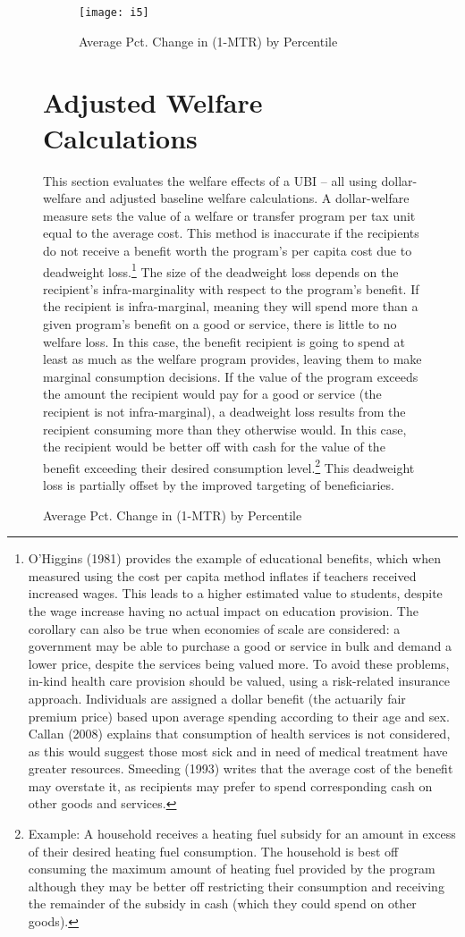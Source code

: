 \documentclass{article}
\begin{document}
\begin{figure}[H]
\begin{figure}[H]
\centering
\caption{Average Pct. Change in (1-MTR) by Percentile}
\texttt{[image: i5]}
\end{figure}

\section{Adjusted Welfare Calculations}
This section evaluates the welfare effects of a UBI -- all using dollar-welfare and adjusted baseline welfare calculations. A dollar-welfare measure sets the value of a welfare or transfer program per tax unit equal to the average cost. This method is inaccurate if the recipients do not receive a benefit worth the program’s per capita cost due to deadweight loss.\footnote{ O'Higgins (1981) provides the example of educational benefits, which when measured using the cost per capita method inflates if teachers received increased wages. This leads to a higher estimated value to students, despite the wage increase having no actual impact on education provision. The corollary can also be true when economies of scale are considered: a government may be able to purchase a good or service in bulk and demand a lower price, despite the services being valued more. To avoid these problems, in-kind health care provision should be valued, using a risk-related insurance approach. Individuals are assigned a dollar benefit (the actuarily fair premium price) based upon average spending according to their age and sex. Callan (2008) explains that consumption of health services is not considered, as this would suggest those most sick and in need of medical treatment have greater resources. Smeeding (1993) writes that the average cost of the benefit may overstate it, as recipients may prefer to spend corresponding cash on other goods and services.} The size of the deadweight loss depends on the recipient’s infra-marginality with respect to the program’s benefit. If the recipient is infra-marginal, meaning they will spend more than a given program’s benefit on a good or service, there is little to no welfare loss. In this case, the benefit recipient is going to spend at least as much as the welfare program provides, leaving them to make marginal consumption decisions. If the value of the program exceeds the amount the recipient would pay for a good or service (the recipient is not infra-marginal), a deadweight loss results from the recipient consuming more than they otherwise would. In this case, the recipient would be better off with cash for the value of the benefit exceeding their desired consumption level.\footnote{Example: A household receives a heating fuel subsidy for an amount in excess of their desired heating fuel consumption. The household is best off consuming the maximum amount of heating fuel provided by the program although they may be better off restricting their consumption and receiving the remainder of the subsidy in cash (which they could spend on other goods).} This deadweight loss is partially offset by the improved targeting of beneficiaries.


\end{figure}
\end{document}
